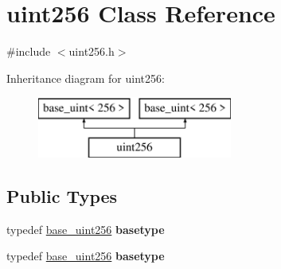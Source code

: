 \hypertarget{classuint256}{}\section{uint256 Class Reference}
\label{classuint256}


{\ttfamily \#include $<$uint256.\+h$>$}

Inheritance diagram for uint256\+:\begin{figure}[H]
\begin{center}
\leavevmode
\includegraphics[height=2.000000cm]{classuint256}
\end{center}
\end{figure}
\subsection*{Public Types}
\begin{DoxyCompactItemize}
\item 
\mbox{\label{classuint256_a13789ba200f7ccfef3f2415daaf8ce26}} 
typedef \mbox{\hyperlink{classbase__uint}{base\+\_\+uint256}} {\bfseries basetype}
\item 
\mbox{\label{classuint256_a13789ba200f7ccfef3f2415daaf8ce26}} 
typedef \mbox{\hyperlink{classbase__uint}{base\+\_\+uint256}} {\bfseries basetype}
\end{DoxyCompactItemize}
